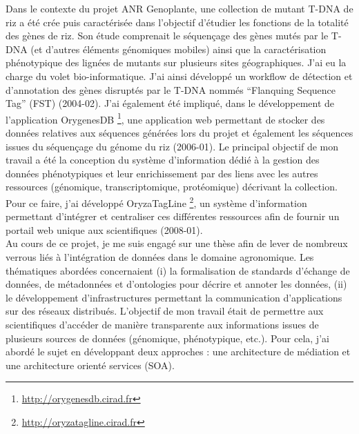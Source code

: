 Dans le contexte du projet ANR Genoplante, une collection de mutant T-DNA de riz a été crée puis caractérisée dans l'objectif d'étudier les fonctions de la totalité des gènes de riz. Son étude comprenait le séquençage des gènes mutés par le T-DNA (et d'autres éléments génomiques mobiles) ainsi que la caractérisation phénotypique des lignées de mutants sur plusieurs sites géographiques. J'ai eu la charge du volet bio-informatique. J'ai ainsi développé un workflow de détection et d'annotation des  gènes disruptés par le T-DNA nommés ``Flanquing Sequence Tag'' (FST)  (2004-02). J'ai également été impliqué, dans le développement de l'application OrygenesDB \footnote{\url{http://orygenesdb.cirad.fr}}, une application web permettant de stocker des données relatives aux séquences générées lors du projet et également les séquences issues du séquençage du génome du riz (2006-01). Le principal objectif de mon travail a été la conception du système d'information dédié à la gestion des données phénotypiques et leur enrichissement par des liens avec les autres ressources (génomique, transcriptomique, protéomique) décrivant la collection. Pour ce faire, j’ai développé OryzaTagLine \footnote{\url{http://oryzatagline.cirad.fr}}, un système d’information permettant d’intégrer et centraliser ces différentes ressources afin de fournir un portail web unique aux scientifiques (2008-01).\\

Au cours de ce projet, je me suis engagé sur une thèse afin de lever de nombreux verrous liés à l’intégration de données dans le domaine agronomique. Les thématiques abordées concernaient (i) la formalisation de standards d’échange de données, de métadonnées et d’ontologies pour décrire et annoter les données, (ii) le développement d’infrastructures permettant la communication d’applications sur des réseaux distribués. L’objectif de mon travail était de permettre aux scientifiques d'accéder de manière transparente aux informations issues de plusieurs sources de données (génomique, phénotypique, etc.).  Pour cela, j’ai abordé le sujet en développant deux approches : une architecture de médiation et une architecture orienté services (SOA).  

